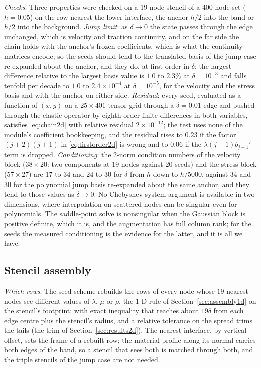 \documentclass[11pt]{amsart}
\theoremstyle{definition}
\theoremstyle{remark}
\newcommand{\para}[1]{\par\smallskip\noindent\textit{#1}.\enspace}
\begin{document}
\para{Checks}
Three properties were checked on a 19-node stencil of a $400$-node set
($h = 0.05$) on the row nearest the lower interface, the anchor $h / 2$
into the band or $h / 2$ into the background. \emph{Jump limit}: as
$\delta \to 0$ the state passes through the edge unchanged, which is
velocity and traction continuity, and on the far side the chain holds
with the anchor's frozen coefficients, which is what the continuity
matrices encode; so the seeds should tend to the translated basis of the
jump case re-expanded about the anchor, and they do, at first order in
$\delta$: the largest difference relative to the largest basis value is
$1.0$ to $2.3\%$ at $\delta = 10^{-3}$ and falls tenfold per decade to
$1.0$ to $2.4 \times 10^{-4}$ at $\delta = 10^{-5}$, for the velocity and
the stress basis and with the anchor on either side. \emph{Residual}:
every seed, evaluated as a function of $(x, y)$ on a $25 \times 401$
tensor grid through a $\delta = 0.01$ edge and pushed through the
elastic operator by eighth-order finite differences in both variables,
satisfies \eqref{eq:chain2d} with relative residual $2 \times 10^{-12}$;
the test uses none of the module's coefficient bookkeeping, and the
residual rises to $0.23$ if the factor $(j + 2)(j + 1)$ in
\eqref{eq:firstorder2d} is wrong and to $0.06$ if the $\lambda (j + 1)
b_{j+1}'$ term is dropped. \emph{Conditioning}: the 2-norm condition
numbers of the velocity block ($38 \times 20$: two components at $19$
nodes against $20$ seeds) and the stress block ($57 \times 27$) are $17$
to $34$ and $24$ to $30$ for $\delta$ from $h$ down to $h / 5000$,
against $34$ and $30$ for the polynomial jump basis re-expanded about the
same anchor, and they tend to those values as $\delta \to 0$. No
Chebyshev-system argument is available in two dimensions, where
interpolation on scattered nodes can be singular even for polynomials.
The saddle-point solve is nonsingular when the Gaussian block is
positive definite, which it is, and the augmentation has full column
rank; for the seeds the measured conditioning is the evidence for the
latter, and it is all we have.

\subsection{Stencil assembly}
\label{sec:assembly2d}
\para{Which rows}
The seed scheme rebuilds the rows of every node whose $19$ nearest
nodes see different values of $\lambda$, $\mu$ or $\rho$, the 1-D rule
of Section~\ref{sec:assembly1d} on the stencil's footprint: with exact
inequality that reaches about $19\delta$ from each edge centre plus the
stencil's radius, and a relative tolerance on the spread trims the tails
(the trim of Section~\ref{sec:results2d}). The nearest interface, by
vertical offset, sets the frame of a rebuilt row; the material profile
along its normal carries both edges of the band, so a stencil that sees
both is marched through both, and the triple stencils of the jump case
are not needed.
\end{document}
